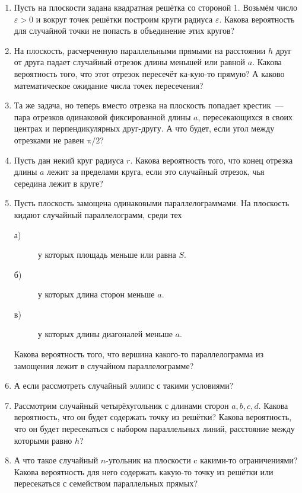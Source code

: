 \begin{enumerate}
\item Пусть на плоскости задана квадратная решётка со стороной 1. Возьмём число $\varepsilon>0$ и вокруг точек решётки построим круги радиуса $\varepsilon$. Какова вероятность для случайной точки не попасть в объединение этих кругов?

\item На плоскость, расчерченную параллельными прямыми на расстоянии $h$  друг от друга падает случайный отрезок длины меньшей или равной $a$. Какова вероятность того, что этот отрезок пересечёт ка-\linebreak кую-то прямую? А каково математическое ожидание числа точек пересечения?
\item Та же задача, но теперь вместо отрезка на плоскость попадает крестик~— пара отрезков одинаковой фиксированной длины $a$, пересекающихся в своих центрах и перпендикулярных друг-другу. А что будет, если угол между отрезками не равен $\text{π}/2$?
\item Пусть дан некий круг радиуса $r$. Какова вероятность того, что конец отрезка длины $a$ лежит за пределами круга, если это случайный отрезок, чья середина лежит в круге?
\item Пусть плоскость замощена одинаковыми параллелограммами. На плоскость кидают случайный параллелограмм, среди тех 
\begin{description}
\item[а)] у которых площадь меньше или равна $S$.
\item[б)] у которых длина сторон меньше $a$.
\item[в)] у которых длины диагоналей меньше $a$.
\end{description}
Какова вероятность того, что вершина какого-то параллелограмма из замощения лежит в случайном параллелограмме?
\item А если рассмотреть случайный эллипс с такими условиями?
\item Рассмотрим случайный четырёхугольник с длинами сторон $a, b, c, d$. Какова вероятность, что он будет содержать точку из решётки? Какова вероятность, что он будет пересекаться с набором параллельных линий, расстояние между которыми равно $h$?
\item А что такое случайный $n$-угольник на плоскости c какими-то ограничениями? Какова вероятность для него содержать какую-то точку из решётки или пересекаться с семейством параллельных прямых?
\end{enumerate}


